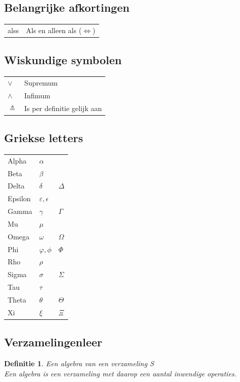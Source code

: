 \documentclass[a4paper]{article}
\newtheorem{tdefinitie}{Definitie}[section]
\newenvironment{definitie}[1]%
  {\begin{mdframed}[backgroundcolor=silver,
    topline=false,
    rightline=false,
    leftline=false,
    bottomline=false]\begin{tdefinitie}#1\\\normalfont}%
  {\end{tdefinitie}\end{mdframed}}
\begin{document}
\subsection{Belangrijke afkortingen}

\begin{tabular}{l|l}
	alss & Als en alleen als ($\Leftrightarrow$) \\
\end{tabular}

\subsection{Wiskundige symbolen}

\begin{tabular}{l|l}
	$\vee$ & Supremum \\
	$\wedge$ & Infimum \\
	$\triangleq$ & Is per definitie gelijk aan \\
\end{tabular}

\subsection{Griekse letters}

\begin{tabular}{l|l|l}
	Alpha & $\alpha$ & \\
	Beta & $\beta$ & \\
	Delta & $\delta$ & $\Delta$ \\
	Epsilon & $\varepsilon, \epsilon$ & \\
	Gamma & $\gamma$ & $\Gamma$ \\
	Mu & $\mu$ & \\
	Omega & $\omega$ & $\Omega$ \\
	Phi & $\varphi, \phi$ & $\Phi$ \\
	Rho & $\rho$ & \\
	Sigma & $\sigma$ & $\Sigma$ \\
	Tau & $\tau$ & \\
	Theta & $\theta$ & $\Theta$ \\
	Xi & $\xi$ & $\Xi$ \\
\end{tabular}

\subsection{Verzamelingenleer}

\begin{definitie}{Een algebra van een verzameling S}
Een algebra is een verzameling met daarop een aantal inwendige operaties.
\end{definitie}
\end{document}
